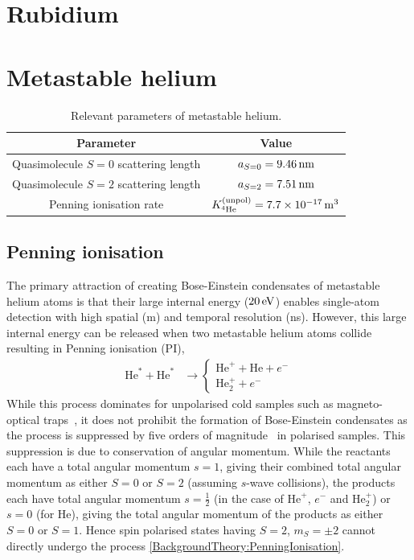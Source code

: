 \section{Rubidium}
\label{BackgroundTheory:Rubidium}
\section{Metastable helium}
\label{BackgroundTheory:Helium}

\begin{table}
    \centering
    \begin{tabular}{cc}
    \toprule
    Parameter & Value\\
    \midrule
    Quasimolecule $S=0$ scattering length & $a_{S=0}=\unit[9.46]{nm}$\\
    Quasimolecule $S=2$ scattering length & $a_{S=2}=\unit[7.51]{nm}$\\
    Penning ionisation rate & $\Kunpol = \unit[7.7\times 10^{-17}]{m\textsuperscript{3}}$\\
    \bottomrule
    \end{tabular}
    \caption{\label{BackgroundTheory:He*Parameters} Relevant parameters of metastable helium.}
\end{table}

\subsection{Penning ionisation}
\label{BackgroundTheory:PenningIonisation}

The primary attraction of creating Bose-Einstein condensates of metastable helium atoms is that their large internal energy ($\unit[20]{eV}$) enables single-atom detection with high spatial (\micro m) and temporal resolution (ns). However, this large internal energy can be released when two metastable helium atoms collide resulting in Penning ionisation (PI),
\begin{align}
    \label{BackgroundTheory:PenningIonisation}
    \text{He}^* + \text{He}^* & \rightarrow \left\{
        \begin{matrix}
            \text{He}^+ + \text{He} + e^-\\
            \text{He}_2^+ + e^-
        \end{matrix}\right.
\end{align}
While this process dominates for unpolarised cold samples such as magneto-optical traps~\citep{Bardou:1992}, it does not prohibit the formation of Bose-Einstein condensates as the process is suppressed by five orders of magnitude~\citep{Shlyapnikov:1994} in polarised samples.  This suppression is due to conservation of angular momentum. While the reactants each have a total angular momentum $s=1$, giving their combined total angular momentum as either $S=0$ or $S=2$ (assuming $s$-wave collisions), the products each have total angular momentum $s=\frac{1}{2}$ (in the case of $\text{He}^+$, $e^-$ and $\text{He}_2^+$) or $s=0$ (for $\text{He}$), giving the total angular momentum of the products as either $S=0$ or $S=1$. Hence spin polarised states having $S=2$, $m_S=\pm2$ cannot directly undergo the process \eqref{BackgroundTheory:PenningIonisation}.

